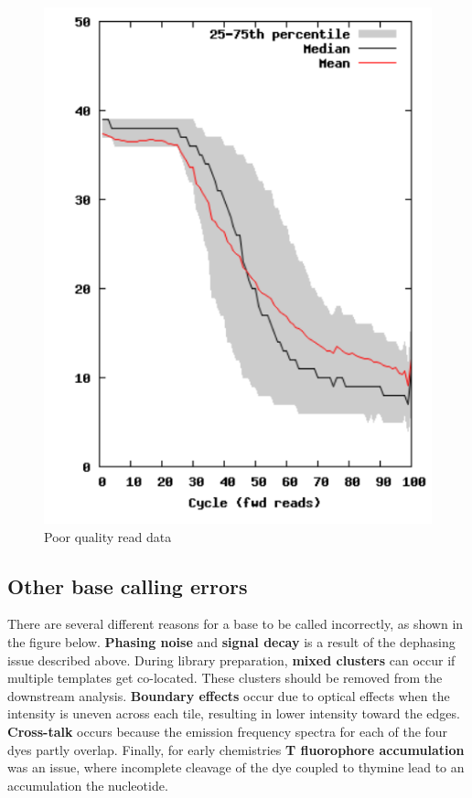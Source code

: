 \documentclass[11pt]{article}
\makeatletter
\def\maxwidth{\ifdim\Gin@nat@width>\linewidth\linewidth
    \else\Gin@nat@width\fi}
\let\Oldincludegraphics\includegraphics
\renewcommand{\includegraphics}[1]{\Oldincludegraphics[width=.8\maxwidth, height=.55\textheight, keepaspectratio]{#1}}
\makeatother
\begin{document}
    \begin{figure}[H]
\centering
\includegraphics{img/base_qual_fail.png}
\caption{Poor quality read data}
\end{figure}

    \hypertarget{other-base-calling-errors}{%
\subsection{Other base calling errors}\label{other-base-calling-errors}}

There are several different reasons for a base to be called incorrectly,
as shown in the figure below. \textbf{Phasing noise} and \textbf{signal
decay} is a result of the dephasing issue described above. During
library preparation, \textbf{mixed clusters} can occur if multiple
templates get co-located. These clusters should be removed from the
downstream analysis. \textbf{Boundary effects} occur due to optical
effects when the intensity is uneven across each tile, resulting in
lower intensity toward the edges. \textbf{Cross-talk} occurs because the
emission frequency spectra for each of the four dyes partly overlap.
Finally, for early chemistries \textbf{T fluorophore accumulation} was
an issue, where incomplete cleavage of the dye coupled to thymine lead
to an accumulation the nucleotide.
\end{document}
